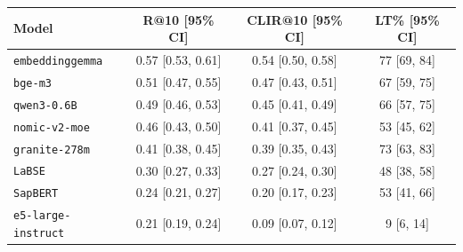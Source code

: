 \begin{tabular}{lccc}
\toprule
Model & R@10 [95\% CI] & CLIR@10 [95\% CI] & LT\% [95\% CI] \\
\midrule
\texttt{embeddinggemma} & 0.57 [0.53, 0.61] & 0.54 [0.50, 0.58] & 77 [69, 84] \\
\texttt{bge-m3} & 0.51 [0.47, 0.55] & 0.47 [0.43, 0.51] & 67 [59, 75] \\
\texttt{qwen3-0.6B} & 0.49 [0.46, 0.53] & 0.45 [0.41, 0.49] & 66 [57, 75] \\
\texttt{nomic-v2-moe} & 0.46 [0.43, 0.50] & 0.41 [0.37, 0.45] & 53 [45, 62] \\
\texttt{granite-278m} & 0.41 [0.38, 0.45] & 0.39 [0.35, 0.43] & 73 [63, 83] \\
\texttt{LaBSE} & 0.30 [0.27, 0.33] & 0.27 [0.24, 0.30] & 48 [38, 58] \\
\texttt{SapBERT} & 0.24 [0.21, 0.27] & 0.20 [0.17, 0.23] & 53 [41, 66] \\
\texttt{e5-large-instruct} & 0.21 [0.19, 0.24] & 0.09 [0.07, 0.12] & 9 [6, 14] \\
\bottomrule
\end{tabular}
